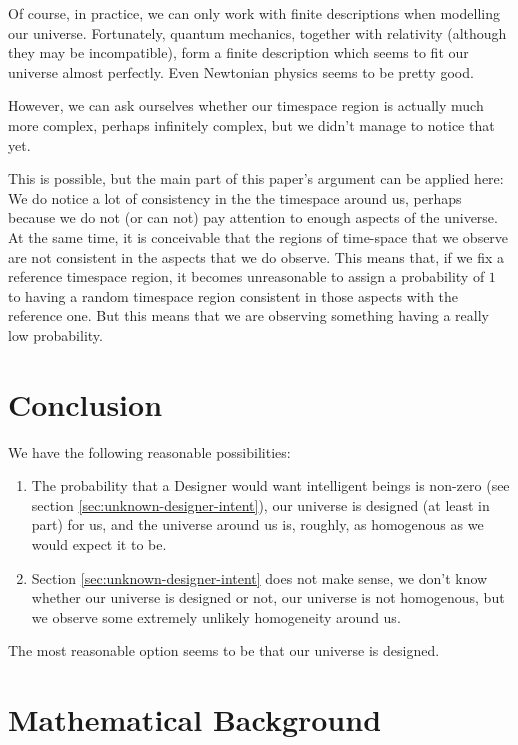 \documentclass[a4paper
,draft
]{article}
\begin{document}
Of course, in practice, we can only work with finite descriptions when
modelling our universe.
Fortunately, quantum mechanics, together with
relativity (although they may be incompatible), form a finite description which
seems to fit our universe almost perfectly.
Even Newtonian physics seems to be pretty good.

However, we can ask ourselves whether our timespace
region is actually much more complex, perhaps infinitely complex,
but we didn't manage to notice that yet.

This is possible, but the main part of this paper's argument can be applied here:
We do notice a lot of consistency in the the timespace around us, perhaps
because we do not (or can not) pay attention to enough aspects of the universe.
At the same time, it is conceivable that the regions of time-space that we
observe are not consistent in the aspects that we do observe.
This means that, if we fix a reference timespace region, it
becomes unreasonable to assign a probability of $1$ to having a random
timespace region consistent in those aspects with the reference one.
But this means that we are observing something having a really low probability.

\section{Conclusion}
\label{sec:conclusion}

We have the following reasonable possibilities:

\begin{enumerate}
\item The probability that a Designer would want intelligent beings
      is non-zero (see section \ref{sec:unknown-designer-intent}),
      our universe is designed (at least in part) for us,
      and the universe around us is, roughly, as homogenous as we would
      expect it to be.
\item Section \ref{sec:unknown-designer-intent} does not make sense,
      we don't know whether our universe is designed or not,
      our universe is not homogenous, but we observe some
      extremely unlikely homogeneity around us.
\end{enumerate}

The most reasonable option seems to be that our universe is designed.

\section{Mathematical Background}
\label{sec:background}
\end{document}
